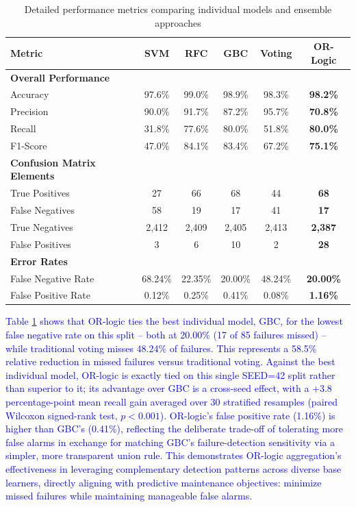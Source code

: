 \begin{table}[htbp]
\centering
\caption{Detailed performance metrics comparing individual models and ensemble approaches}
\label{tab:detailed_metrics}
\begin{tabular}{lccccc}
\hline
\textbf{Metric} & \textbf{SVM} & \textbf{RFC} & \textbf{GBC} & \textbf{Voting} & \textbf{OR-Logic} \\
\hline
\textbf{Overall Performance} & & & & & \\
\quad Accuracy & 97.6\% & 99.0\% & 98.9\% & 98.3\% & \textbf{98.2\%} \\
\quad Precision & 90.0\% & 91.7\% & 87.2\% & 95.7\% & \textbf{70.8\%} \\
\quad Recall & 31.8\% & 77.6\% & 80.0\% & 51.8\% & \textbf{80.0\%} \\
\quad F1-Score & 47.0\% & 84.1\% & 83.4\% & 67.2\% & \textbf{75.1\%} \\
\hline
\textbf{Confusion Matrix Elements} & & & & & \\
\quad True Positives & 27 & 66 & 68 & 44 & \textbf{68} \\
\quad False Negatives & 58 & 19 & 17 & 41 & \textbf{17} \\
\quad True Negatives & 2,412 & 2,409 & 2,405 & 2,413 & \textbf{2,387} \\
\quad False Positives & 3 & 6 & 10 & 2 & \textbf{28} \\
\hline
\textbf{Error Rates} & & & & & \\
\quad False Negative Rate & 68.24\% & 22.35\% & 20.00\% & 48.24\% & \textbf{20.00\%} \\
\quad False Positive Rate & 0.12\% & 0.25\% & 0.41\% & 0.08\% & \textbf{1.16\%} \\
\hline
\end{tabular}
\end{table}

\textcolor{blue}{Table \ref{tab:detailed_metrics} shows that OR-logic ties the best individual model, GBC, for the lowest false negative rate on this split -- both at 20.00\% (17 of 85 failures missed) -- while traditional voting misses 48.24\% of failures. This represents a 58.5\% relative reduction in missed failures versus traditional voting. Against the best individual model, OR-logic is exactly tied on this single SEED=42 split rather than superior to it; its advantage over GBC is a cross-seed effect, with a +3.8 percentage-point mean recall gain averaged over 30 stratified resamples (paired Wilcoxon signed-rank test, $p<0.001$). OR-logic's false positive rate (1.16\%) is higher than GBC's (0.41\%), reflecting the deliberate trade-off of tolerating more false alarms in exchange for matching GBC's failure-detection sensitivity via a simpler, more transparent union rule. This demonstrates OR-logic aggregation's effectiveness in leveraging complementary detection patterns across diverse base learners, directly aligning with predictive maintenance objectives: minimize missed failures while maintaining manageable false alarms.}

